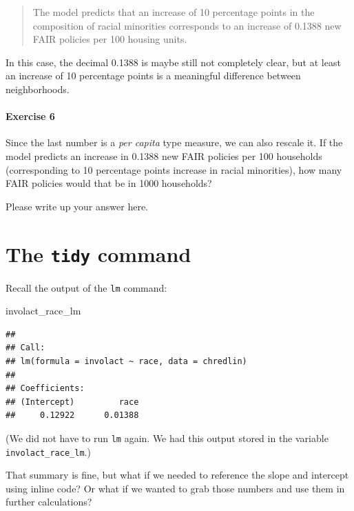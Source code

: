 \documentclass[
]{book}
\newenvironment{Shaded}{\begin{snugshade}}{\end{snugshade}}
\newcommand{\NormalTok}[1]{#1}
\begin{document}
\begin{quote}
The model predicts that an increase of 10 percentage points in the composition of racial minorities corresponds to an increase of 0.1388 new FAIR policies per 100 housing units.
\end{quote}

In this case, the decimal 0.1388 is maybe still not completely clear, but at least an increase of 10 percentage points is a meaningful difference between neighborhoods.

\hypertarget{exercise-6-2}{%
\paragraph*{Exercise 6}\label{exercise-6-2}}

Since the last number is a \emph{per capita} type measure, we can also rescale it. If the model predicts an increase in 0.1388 new FAIR policies per 100 households (corresponding to 10 percentage points increase in racial minorities), how many FAIR policies would that be in 1000 households?

Please write up your answer here.

\hypertarget{regression-tidy}{%
\section{\texorpdfstring{The \texttt{tidy} command}{The tidy command}}\label{regression-tidy}}

Recall the output of the \texttt{lm} command:

\begin{Shaded}
\begin{Highlighting}[]
\NormalTok{involact\_race\_lm}
\end{Highlighting}
\end{Shaded}

\begin{verbatim}
## 
## Call:
## lm(formula = involact ~ race, data = chredlin)
## 
## Coefficients:
## (Intercept)         race  
##     0.12922      0.01388
\end{verbatim}

(We did not have to run \texttt{lm} again. We had this output stored in the variable \texttt{involact\_race\_lm}.)

That summary is fine, but what if we needed to reference the slope and intercept using inline code? Or what if we wanted to grab those numbers and use them in further calculations?
\end{document}
